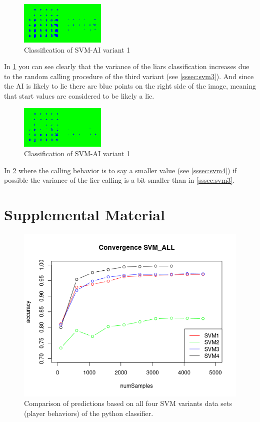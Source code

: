 \documentclass[11pt]{article}
\begin{document}
\begin{figure}[H]
	\centering
	\includegraphics[width=.45\textwidth]{../testdata/svm3.png}
	\caption{Classification of SVM-AI variant 1}
	\label{fig:svm3}
\end{figure}
In \cref{fig:svm3} you can see clearly that the variance of the liars classification increases due to the random calling procedure of the third variant (see \cref{sssec:svm3}). And since the AI is likely to lie there are blue points on the right side of the image, meaning that start values are considered to be likely a lie. 

\begin{figure}[H]
	\centering
	\includegraphics[width=.45\textwidth]{../testdata/svm4.png}
	\caption{Classification of SVM-AI variant 1}
	\label{fig:svm4}
\end{figure}

In \cref{fig:svm4} where the calling behavior is to say a smaller value (see \cref{sssec:svm4}) if possible the variance of the lier calling is a bit smaller than in \cref{sssec:svm3}.


\FloatBarrier
\section{Supplemental Material}

\begin{figure}[H]
	\centering
	\includegraphics[width=.45\textwidth]{../testdata/convergence_all.png}
	\caption{Comparison of predictions based on all four SVM variants data sets (player behaviors) of the python classifier.}
	\label{fig:conv_svmall}
\end{figure}
\end{document}
